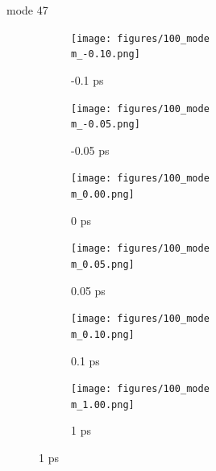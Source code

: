 \documentclass{beamer}
\newcommand\w{0.32}
\begin{document}
\renewcommand\m{47}
\begin{frame}{mode \m}
	\begin{figure}
		\centering
		\begin{subfigure}[b]{\w\textwidth}
			\centering
			\texttt{[image: figures/100\_mode\\m\_-0.10.png]}
			\caption{-0.1 ps}
		\end{subfigure}
		\begin{subfigure}[b]{\w\textwidth}
			\centering
			\texttt{[image: figures/100\_mode\\m\_-0.05.png]}
			\caption{-0.05 ps}
		\end{subfigure}
		\begin{subfigure}[b]{\w\textwidth}
			\centering
			\texttt{[image: figures/100\_mode\\m\_0.00.png]}
			\caption{0 ps}
		\end{subfigure}
		\begin{subfigure}[b]{\w\textwidth}
			\centering
			\texttt{[image: figures/100\_mode\\m\_0.05.png]}
			\caption{0.05 ps}
		\end{subfigure}
		\begin{subfigure}[b]{\w\textwidth}
			\centering
			\texttt{[image: figures/100\_mode\\m\_0.10.png]}
			\caption{0.1 ps}
		\end{subfigure}
		\begin{subfigure}[b]{\w\textwidth}
			\centering
			\texttt{[image: figures/100\_mode\\m\_1.00.png]}
			\caption{1 ps}
		\end{subfigure}
	\end{figure}
\end{frame}

\fi %
\end{document}
